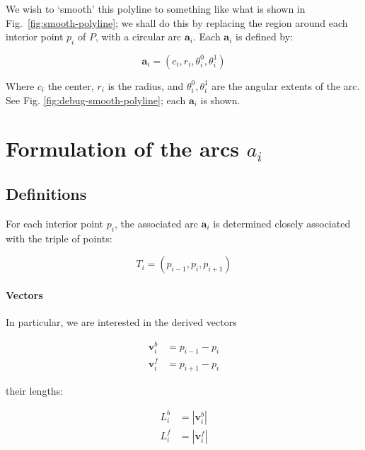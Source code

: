 \documentclass{article}
\begin{document}
We wish to `smooth' this polyline to something like what is shown in Fig.~\ref{fig:smooth-polyline}; we shall do this by replacing the region around each interior point $p_{i}$ of $P$, with a circular arc $\mathbf{a}_{i}$.  Each $\mathbf{a}_{i}$ is defined by:

\begin{equation}
  \label{eq:circ-def}
\mathbf{a}_i=\left(
  c_{i},
  r_{i},
  \theta^{0}_{i},
  \theta^{1}_{i}
\right)
\end{equation}

Where $c_{i}$ the center, $r_{i}$ is the radius, and $\theta^{0}_{i}, \theta^{1}_{i}$ are the angular extents of the arc.  See Fig. \ref{fig:debug-smooth-polyline}; each $\mathbf{a}_{i}$ is shown.

\section{Formulation of the arcs $a_{i}$}

\subsection{Definitions}

For each interior point $p_{i}$, the associated arc $\mathbf{a}_{i}$ is determined closely associated with the triple of points:

\begin{equation}
  \label{eq:arc-triple}
  T_{i} = \left(p_{i-1}, p_{i}, p_{i+1}\right)
\end{equation}

\paragraph{Vectors}

In particular, we are interested in the derived vectors

\begin{align}
  \label{eq:vector-b}
  \mathbf{v}^{b}_{i} &= p_{i-1} - p_{i}\\
  \label{eq:vector-f}
  \mathbf{v}^{f}_{i} &= p_{i+1} - p_{i}
\end{align}

their lengths:

\begin{align}
  \label{eq:vector-length-b}
  L^{b}_{i} &= \left|\mathbf{v}^{b}_{i}\right|\\
  \label{eq:vector-length-f}
  L^{f}_{i} &= \left|\mathbf{v}^{f}_{i}\right|
\end{align}
\end{document}
